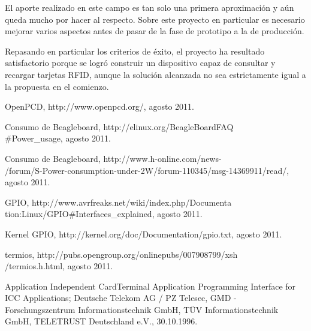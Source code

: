 \documentclass[%
        final,
        notitlepage,
        narroweqnarray,
        inline,
        ]{ieee}
\begin{document}
El aporte realizado en este campo es tan solo una primera aproximación y aún 
queda mucho por hacer al respecto. Sobre este proyecto en particular es
necesario mejorar varios aspectos antes de pasar de la fase de prototipo
a la de producción.


Repasando en particular los criterios de éxito, el proyecto ha resultado satisfactorio
porque se logró construir un dispositivo capaz de consultar y recargar tarjetas RFID,
aunque la solución alcanzada no sea estrictamente igual a la propuesta en el comienzo.




%
%
\begin{thebibliography}{10}

 OpenPCD, http://www.openpcd.org/, agosto 2011.

 Consumo de Beagleboard, http://elinux.org/BeagleBoardFAQ\\
\#Power\_usage, agosto 2011.

 Consumo de Beagleboard, http://www.h-online.com/news-\\
/forum/S-Power-consumption-under-2W/forum-110345/msg-14369911/read/, agosto 2011.

 GPIO, http://www.avrfreaks.net/wiki/index.php/Documenta\\
tion:Linux/GPIO\#Interfaces\_explained, agosto 2011.

 Kernel GPIO, http://kernel.org/doc/Documentation/gpio.txt, agosto 2011.

 termios, http://pubs.opengroup.org/onlinepubs/007908799/xsh\\
/termios.h.html, agosto 2011.

 Application Independent CardTerminal Application Programming Interface for ICC Applications; 
Deutsche Telekom AG / PZ Telesec, GMD - Forschungszentrum Informationstechnik GmbH, TÜV Informationstechnik GmbH, TELETRUST Deutschland e.V., 30.10.1996.

\end{thebibliography}


\end{document}
